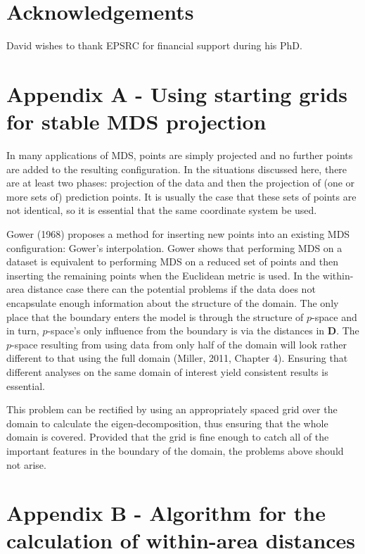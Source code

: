 \documentclass[useAMS, referee]{biom}
\begin{document}
\section*{Acknowledgements}

David wishes to thank EPSRC for financial support during his PhD.


\section*{Appendix A - Using starting grids for stable MDS projection}

In many applications of MDS, points are simply projected and no further points are added to the resulting configuration. In the situations discussed here, there are at least two phases: projection of the data and then the projection of (one or more sets of) prediction points. It is usually the case that these sets of points are not identical, so it is essential that the same coordinate system be used.

Gower (1968) proposes a method for inserting new points into an existing MDS configuration: Gower's interpolation. Gower shows that performing MDS on a dataset is equivalent to performing MDS on a reduced set of points and then inserting the remaining points when the Euclidean metric is used. In the within-area distance case there can the potential problems if the data does not encapsulate enough information about the structure of the domain. The only place that the boundary enters the model is through the structure of $p$-space and in turn, $p$-space's only influence from the boundary is via the distances in $\mathbf{D}$. The $p$-space resulting from using data from only half of the domain will look rather different to that using the full domain (Miller, 2011, Chapter 4). Ensuring that different analyses on the same domain of interest yield consistent results is essential.

This problem can be rectified by using an appropriately spaced grid over the domain to calculate the eigen-decomposition, thus ensuring that the whole domain is covered. Provided that the grid is fine enough to catch all of the important features in the boundary of the domain, the problems above should not arise.

\section*{Appendix B - Algorithm for the calculation of within-area distances}
\end{document}

